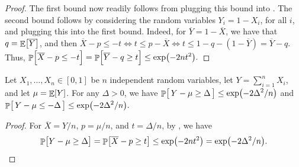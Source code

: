 \begin{proof}
    The first bound now readily follows from plugging this bound into
    . The second bound follows by considering the
    random variables $Y_i =1-X_i$, for all $i$, and plugging this into the
    first bound. Indeed, for $\overline{Y} = 1-\overline{X}$, we have
    that $q = \mathop{\mathbb{E}}\!\left[ {\overline{Y}} \right]$, and then
    \begin{math}
        \overline{X} - p \leq -t%
        \iff%
        t \leq p - \overline{X}%
        \iff%
        t \leq 1-q - (1- \overline{Y}) = \overline{Y} - q.
    \end{math}
    Thus,
    \begin{math}%
        \ds%
        \Prob{\Bigl.\overline{X} - p \leq -t }%
        = \Prob{\Bigl.\overline{Y} - q \geq t }%
        \leq%
        \exp\pth{ -2 n t^2}.
    \end{math}
\end{proof}

\begin{corollary}
    Let $X_1, \ldots, X_n \in [0,1]$ be $n$ independent random variables, let
    $Y = \sum_{i=1}^n X_i$, and let $\mu = \mathop{\mathbb{E}}\!\left[ {Y} \right]$.  For any
    $\Delta > 0$, we have
    \begin{math}%
        \ds%
        \Prob{\bigl.\,Y - \mu \geq \Delta\, }%
        \leq%
        \exp\pth{ -2 \Delta^2/n}
    \end{math}
    and
    \begin{math}%
        \ds%
        \Prob{\bigl.\, Y - \mu \leq -\Delta \, }%
        \leq%
        \exp\pth{ -2 \Delta^2/n}.
    \end{math}
\end{corollary}

\begin{proof}
    For $\overline{X} = Y/n$, $p =\mu /n $, and $t = \Delta/n$, by
    , we have
    \begin{equation*}
        \Prob{\bigl.Y - \mu \geq \Delta }%
        =%
        \Prob{\bigl. \smash{\overline{X}} - p \geq t }%
        \ds%
        \leq%
        \exp\pth{ -2 nt^2 }
        =%
        \exp\pth{ -2 \Delta^2 /n  }.
    \end{equation*}
\end{proof}


